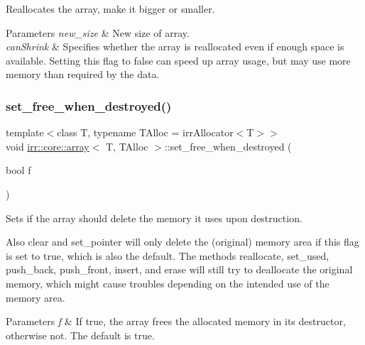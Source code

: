 Reallocates the array, make it bigger or smaller. 


\begin{DoxyParams}{Parameters}
{\em new\+\_\+size} & New size of array. \\
\hline
{\em can\+Shrink} & Specifies whether the array is reallocated even if enough space is available. Setting this flag to false can speed up array usage, but may use more memory than required by the data. \\
\hline
\end{DoxyParams}
\mbox{\label{classirr_1_1core_1_1array_afddd43e25d3ad6b1a3d75ceab13e6c56}} 
\subsubsection{\texorpdfstring{set\+\_\+free\+\_\+when\+\_\+destroyed()}{set\_free\_when\_destroyed()}\hspace{0.1cm}{\footnotesize\ttfamily [1/2]}}
{\footnotesize\ttfamily template$<$class T, typename T\+Alloc = irr\+Allocator$<$\+T$>$$>$ \\
void \hyperlink{classirr_1_1core_1_1array}{irr\+::core\+::array}$<$ T, T\+Alloc $>$\+::set\+\_\+free\+\_\+when\+\_\+destroyed (\begin{DoxyParamCaption}\item[{bool}]{f }\end{DoxyParamCaption})\hspace{0.3cm}{\ttfamily [inline]}}



Sets if the array should delete the memory it uses upon destruction. 

Also clear and set\+\_\+pointer will only delete the (original) memory area if this flag is set to true, which is also the default. The methods reallocate, set\+\_\+used, push\+\_\+back, push\+\_\+front, insert, and erase will still try to deallocate the original memory, which might cause troubles depending on the intended use of the memory area. 
\begin{DoxyParams}{Parameters}
{\em f} & If true, the array frees the allocated memory in its destructor, otherwise not. The default is true. \\
\hline
\end{DoxyParams}
\mbox{\label{classirr_1_1core_1_1array_afddd43e25d3ad6b1a3d75ceab13e6c56}} 
